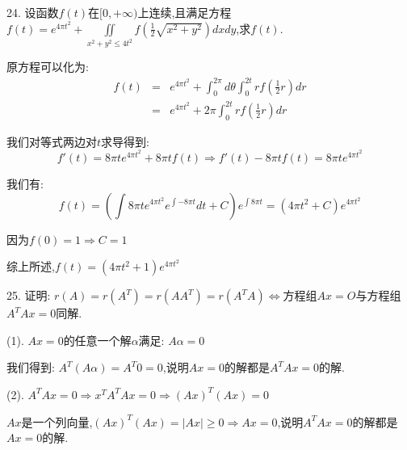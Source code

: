 24. 设函数$f(t)$在$[0,+\infty)$上连续,且满足方程$f(t)=e^{4\pi t^2}+\iint\limits_{x^2+y^2\leq 4t^2}f(\frac{1}{2}\sqrt{x^2+y^2})dxdy$,求$f(t)$.
\begin{solution}
	
	原方程可以化为:  
	\begin{eqnarray*}
		f(t)&=&e^{4\pi t^2}+\int_{0}^{2\pi}d\theta\int_{0}^{2t}rf(\frac{1}{2}r)dr\\
		&=&e^{4\pi t^2}+2\pi\int_{0}^{2t}rf(\frac{1}{2}r)dr
	\end{eqnarray*}
	
	我们对等式两边对$t$求导得到:  
	$$f'(t)=8\pi te^{4\pi t^2}+8\pi tf(t)\Rightarrow f'(t)-8\pi tf(t)=8\pi te^{4\pi t^2}$$
	
	我们有:  
	$$f(t)=(\int 8\pi te^{4\pi t^2}e^{\int-8\pi t}dt+C)e^{\int8\pi t}=( 4\pi t^2+C)e^{4\pi t^2}$$
	
	因为$f(0)=1\Rightarrow C=1$
	
	综上所述,$f(t)=( 4\pi t^2+1)e^{4\pi t^2}$
\end{solution}

25. 证明:  $r(A)=r(A^{T})=r(AA^{T})=r(A^{T}A)\Leftrightarrow$方程组$Ax=O$与方程组$A^{T}Ax=0$同解.
\begin{solution}
	
	(1). $Ax=0$的任意一个解$\alpha$满足:  $A\alpha=0$
	
	我们得到:  $A^{T}(A\alpha)=A^{T}0=0$,说明$Ax=0$的解都是$A^{T}Ax=0$的解.
	
	(2). $A^{T}Ax=0\Rightarrow x^{T}A^{T}Ax=0\Rightarrow (Ax)^{T}(Ax)=0$
	
	$Ax$是一个列向量,$(Ax)^{T}(Ax)=|Ax|\geq 0\Rightarrow Ax=0$,说明$A^{T}Ax=0$的解都是$Ax=0$的解.
\end{solution}

